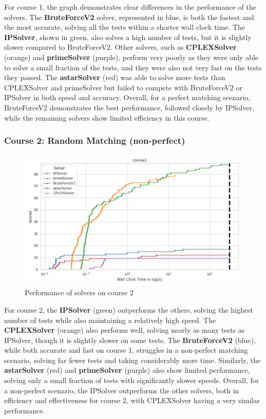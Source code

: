 For course 1, the graph demonstrates clear differences in the performance of the solvers. The \textbf{BruteForceV2} solver, represented in blue, is both the fastest and the most accurate, solving all the tests within a shorter wall clock time. The \textbf{IPSolver}, shown in green, also solves a high number of tests, but it is slightly slower compared to BruteForceV2. Other solvers, such as \textbf{CPLEXSolver} (orange) and \textbf{primeSolver} (purple), perform very poorly as they were only able to solve a small fraction of the tests, and they were also not very fast on the tests they passed. The \textbf{astarSolver} (red) was able to solve more tests than CPLEXSolver and primeSolver but failed to compete with BruteForceV2 or IPSolver in both speed and accuracy. Overall, for a perfect matching scenario, BruteForceV2 demonstrates the best performance, followed closely by IPSolver, while the remaining solvers show limited efficiency in this course.

\subsubsection*{Course 2: Random Matching (non-perfect)}

\begin{figure}[h!]
    \centering
    \includegraphics[width=\textwidth]{Graphs/course2.png}
    \caption{Performance of solvers on course 2}
\end{figure}

For course 2, the \textbf{IPSolver} (green) outperforms the others, solving the highest number of tests while also maintaining a relatively high speed. The \textbf{CPLEXSolver} (orange) also performs well, solving nearly as many tests as IPSolver, though it is slightly slower on some tests. The \textbf{BruteForceV2} (blue), while both accurate and fast on course 1, struggles in a non-perfect matching scenario, solving far fewer tests and taking considerably more time. Similarly, the \textbf{astarSolver} (red) and \textbf{primeSolver} (purple) also show limited performance, solving only a small fraction of tests with significantly slower speeds. Overall, for a non-perfect scenario, the IPSolver outperforms the other solvers, both in efficiency and effectiveness for course 2, with CPLEXSolver having a very similar performance.

